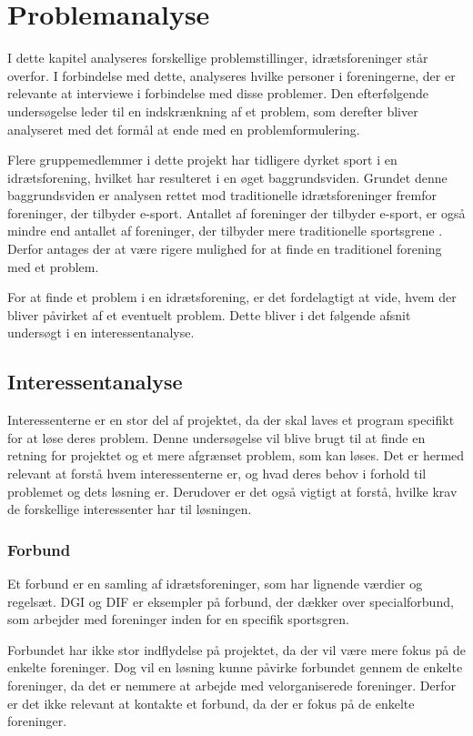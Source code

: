 \chapter{Problemanalyse}\label{ch:ch2label}
I dette kapitel analyseres forskellige problemstillinger, idrætsforeninger står overfor. I forbindelse med dette, analyseres hvilke personer i foreningerne, der er relevante at interviewe i forbindelse med disse problemer. Den efterfølgende undersøgelse leder til en indskrænkning af et problem, som derefter bliver analyseret med det formål at ende med en problemformulering.
\par
Flere gruppemedlemmer i dette projekt har tidligere dyrket sport i en idrætsforening, hvilket har resulteret i en øget baggrundsviden. Grundet denne baggrundsviden er analysen rettet mod traditionelle idrætsforeninger fremfor foreninger, der tilbyder e-sport. Antallet af foreninger der tilbyder e-sport, er også mindre end antallet af foreninger, der tilbyder mere traditionelle sportsgrene \citep{e-sport}. Derfor antages der at være rigere mulighed for at finde en traditionel forening med et problem.
\par
For at finde et problem i en idrætsforening, er det fordelagtigt at vide, hvem der bliver påvirket af et eventuelt problem. Dette bliver i det følgende afsnit undersøgt i en interessentanalyse. 
\newpage
\section{Interessentanalyse}
Interessenterne er en stor del af projektet, da der skal laves et program specifikt for at løse deres problem. Denne undersøgelse vil blive brugt til at finde en retning for projektet og et mere afgrænset problem, som kan løses. Det er hermed relevant at forstå hvem interessenterne er, og hvad deres behov i forhold til problemet og dets løsning er. Derudover er det også vigtigt at forstå, hvilke krav de forskellige interessenter har til løsningen.

\subsection*{Forbund}
Et forbund er en samling af idrætsforeninger, som har lignende værdier og regelsæt. DGI og DIF er eksempler på forbund, der dækker over specialforbund, som arbejder med foreninger inden for en specifik sportsgren.
\par
Forbundet har ikke stor indflydelse på projektet, da der vil være mere fokus på de enkelte foreninger. Dog vil en løsning kunne påvirke forbundet gennem de enkelte foreninger, da det er nemmere at arbejde med velorganiserede foreninger. Derfor er det ikke relevant at kontakte et forbund, da der er fokus på de enkelte foreninger. 

